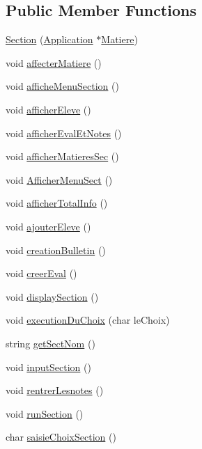 \subsection*{Public Member Functions}
\begin{DoxyCompactItemize}
\item 
\hyperlink{classSection_aa234598f680f101f6c19b9d317d03ab8}{Section} (\hyperlink{classApplication}{Application} $\ast$\hyperlink{classMatiere}{Matiere})
\item 
void \hyperlink{classSection_a896254f116b4e28fdcfbf9de77fff9ac}{affecter\+Matiere} ()
\item 
void \hyperlink{classSection_a4c80d6767cb72c22f94f2141f154befa}{affiche\+Menu\+Section} ()
\item 
void \hyperlink{classSection_a3333ccb500955ece7dfa4756f2b9da96}{afficher\+Eleve} ()
\item 
void \hyperlink{classSection_a4dac08e4e1ef8b06eb066922b220ef92}{afficher\+Eval\+Et\+Notes} ()
\item 
void \hyperlink{classSection_a759c9b674fb250cf9f54d736cfe8b55b}{afficher\+Matieres\+Sec} ()
\item 
void \hyperlink{classSection_ad6383e2088e5fbf9673ca290a7372ee8}{Afficher\+Menu\+Sect} ()
\item 
void \hyperlink{classSection_af08204c35fd6457f66e54fe127d14019}{afficher\+Total\+Info} ()
\item 
void \hyperlink{classSection_a084d7e63296d3bb00e17ea1e558527e9}{ajouter\+Eleve} ()
\item 
void \hyperlink{classSection_a59b4ab57cf491597a92ec95dd61d1478}{creation\+Bulletin} ()
\item 
void \hyperlink{classSection_ac01807cfb625bd19b9778e9664215058}{creer\+Eval} ()
\item 
void \hyperlink{classSection_a2c4c80437393d7dabe5f8c388a32009a}{display\+Section} ()
\item 
void \hyperlink{classSection_a9c7854c62100ac5a935b604450279cf7}{execution\+Du\+Choix} (char le\+Choix)
\item 
string \hyperlink{classSection_a590636c2953d5c523d8d51350a556b04}{get\+Sect\+Nom} ()
\item 
void \hyperlink{classSection_ae24ae0cd4c5bccd919abdf11d297d0d6}{input\+Section} ()
\item 
void \hyperlink{classSection_a5c393d2d96c462ee96ebbb7e25867093}{rentrer\+Lesnotes} ()
\item 
void \hyperlink{classSection_a54dda96066c76cae568d775eab843c17}{run\+Section} ()
\item 
char \hyperlink{classSection_a4e807242d9d2e481ccdb898eeb895678}{saisie\+Choix\+Section} ()
\end{DoxyCompactItemize}

